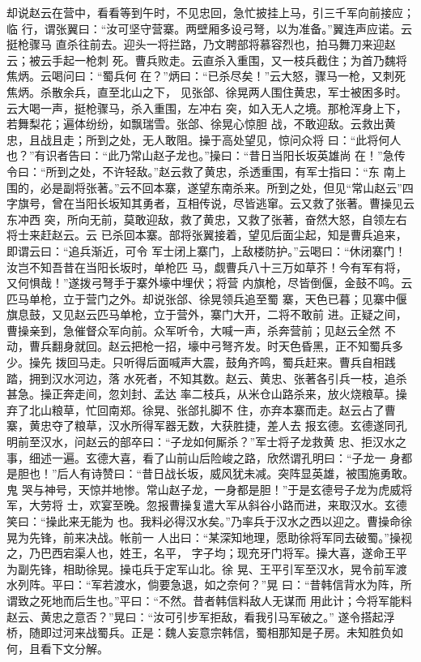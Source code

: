 却说赵云在营中，看看等到午时，不见忠回，急忙披挂上马，引三千军向前接应；临
行，谓张翼曰：“汝可坚守营寨。两壁厢多设弓弩，以为准备。”翼连声应诺。云挺枪骤马
直杀往前去。迎头一将拦路，乃文聘部将慕容烈也，拍马舞刀来迎赵云；被云手起一枪刺
死。曹兵败走。云直杀入重围，又一枝兵截住；为首乃魏将焦炳。云喝问曰：“蜀兵何
在？”炳曰：“已杀尽矣！”云大怒，骤马一枪，又刺死焦炳。杀散余兵，直至北山之下，
见张郃、徐晃两人围住黄忠，军士被困多时。云大喝一声，挺枪骤马，杀入重围，左冲右
突，如入无人之境。那枪浑身上下，若舞梨花；遍体纷纷，如飘瑞雪。张郃、徐晃心惊胆
战，不敢迎敌。云救出黄忠，且战且走；所到之处，无人敢阻。操于高处望见，惊问众将
曰：“此将何人也？”有识者告曰：“此乃常山赵子龙也。”操曰：“昔日当阳长坂英雄尚
在！”急传令曰：“所到之处，不许轻敌。”赵云救了黄忠，杀透重围，有军士指曰：“东
南上围的，必是副将张著。”云不回本寨，遂望东南杀来。所到之处，但见“常山赵云”四
字旗号，曾在当阳长坂知其勇者，互相传说，尽皆逃窜。云又救了张著。曹操见云东冲西
突，所向无前，莫敢迎敌，救了黄忠，又救了张著，奋然大怒，自领左右将士来赶赵云。云
已杀回本寨。部将张翼接着，望见后面尘起，知是曹兵追来，即谓云曰：“追兵渐近，可令
军士闭上寨门，上敌楼防护。”云喝曰：“休闭寨门！汝岂不知吾昔在当阳长坂时，单枪匹
马，觑曹兵八十三万如草芥！今有军有将，又何惧哉！”遂拨弓弩手于寨外壕中埋伏；将营
内旗枪，尽皆倒偃，金鼓不鸣。云匹马单枪，立于营门之外。却说张郃、徐晃领兵追至蜀
寨，天色已暮；见寨中偃旗息鼓，又见赵云匹马单枪，立于营外，寨门大开，二将不敢前
进。正疑之间，曹操亲到，急催督众军向前。众军听令，大喊一声，杀奔营前；见赵云全然
不动，曹兵翻身就回。赵云把枪一招，壕中弓弩齐发。时天色昏黑，正不知蜀兵多少。操先
拨回马走。只听得后面喊声大震，鼓角齐鸣，蜀兵赶来。曹兵自相践踏，拥到汉水河边，落
水死者，不知其数。赵云、黄忠、张著各引兵一枝，追杀甚急。操正奔走间，忽刘封、孟达
率二枝兵，从米仓山路杀来，放火烧粮草。操弃了北山粮草，忙回南郑。徐晃、张郃扎脚不
住，亦弃本寨而走。赵云占了曹寨，黄忠夺了粮草，汉水所得军器无数，大获胜捷，差人去
报玄德。玄德遂同孔明前至汉水，问赵云的部卒曰：“子龙如何厮杀？”军士将子龙救黄
忠、拒汉水之事，细述一遍。玄德大喜，看了山前山后险峻之路，欣然谓孔明曰：“子龙一
身都是胆也！”后人有诗赞曰：“昔日战长坂，威风犹未减。突阵显英雄，被围施勇敢。鬼
哭与神号，天惊并地惨。常山赵子龙，一身都是胆！”于是玄德号子龙为虎威将军，大劳将
士，欢宴至晚。忽报曹操复遣大军从斜谷小路而进，来取汉水。玄德笑曰：“操此来无能为
也。我料必得汉水矣。”乃率兵于汉水之西以迎之。曹操命徐晃为先锋，前来决战。帐前一
人出曰：“某深知地理，愿助徐将军同去破蜀。”操视之，乃巴西宕渠人也，姓王，名平，
字子均；现充牙门将军。操大喜，遂命王平为副先锋，相助徐晃。操屯兵于定军山北。徐
晃、王平引军至汉水，晃令前军渡水列阵。平曰：“军若渡水，倘要急退，如之奈何？”晃
曰：“昔韩信背水为阵，所谓致之死地而后生也。”平曰：“不然。昔者韩信料敌人无谋而
用此计；今将军能料赵云、黄忠之意否？”晃曰：“汝可引步军拒敌，看我引马军破之。”
遂令搭起浮桥，随即过河来战蜀兵。正是：魏人妄意宗韩信，蜀相那知是子房。未知胜负如
何，且看下文分解。